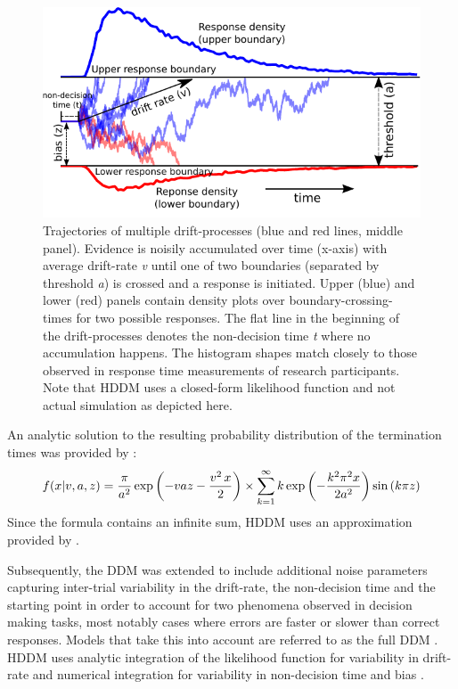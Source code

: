\documentclass[letterpaper,10pt,english]{article}
\begin{document}
\begin{figure}
\centering
\capstart

\includegraphics{fig1.pdf}
\caption{Trajectories of multiple drift-processes (blue and red lines,
middle panel). Evidence is noisily accumulated over time (x-axis) with
average drift-rate \textit{v} until one of two boundaries (separated
by threshold \textit{a}) is crossed and a response is initiated. Upper
(blue) and lower (red) panels contain density plots over
boundary-crossing-times for two possible responses. The flat line in
the beginning of the drift-processes denotes the non-decision time
\textit{t} where no accumulation happens. The histogram shapes match
closely to those observed in response time measurements of research
participants. Note that HDDM uses a closed-form likelihood function
and not actual simulation as depicted here.}
\label{fig.ddm}
\end{figure}

An analytic solution to the resulting probability distribution of
the termination times was provided by \citet{Wald47,Feller68}:
\begin{gather}
\begin{split}f(x|v, a, z) = \frac{\pi}{a^2} \, \text{exp} \left(
-vaz-\frac{v^2\,x}{2} \right) \times \sum_{k=1}^{\infty} k\,
\text{exp} \left( -\frac{k^2\pi^2 x}{2a^2} \right)
\text{sin}\left(k\pi z\right)\end{split}\notag
\end{gather}
Since the formula contains an infinite sum, HDDM uses an approximation
provided by \citep{NavarroFuss09}.

Subsequently, the DDM was extended to include additional noise parameters capturing inter-trial variability in the drift-rate, the non-decision time and the starting point in order to account for two phenomena observed in decision making tasks, most notably cases where errors are faster or slower than correct responses. Models that take this into account are referred to as the full DDM \citep{RatcliffRouder98}. HDDM uses analytic integration of the likelihood function for variability in drift-rate and numerical integration for variability in non-decision time and bias \citep{RatcliffTuerlinckx02}.
\end{document}
